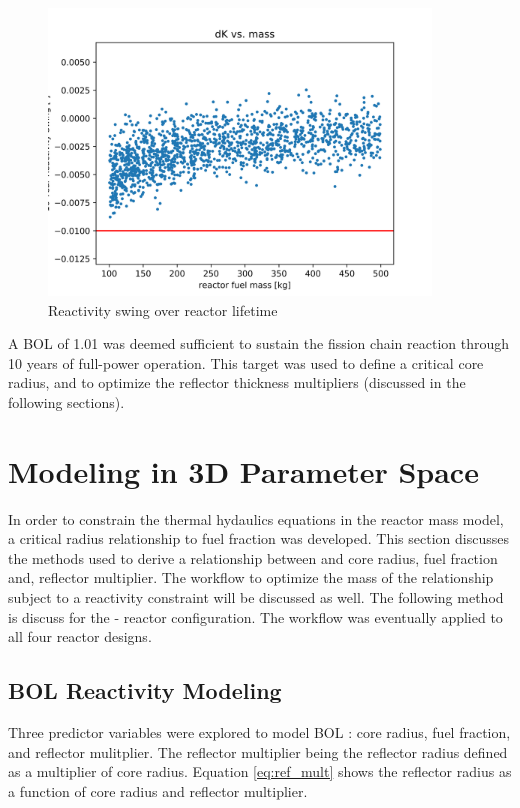 \begin{figure}[h]
    \centering
    \includegraphics[width=4in]{../images/dK_vs_mass.png}
\caption{Reactivity swing over reactor lifetime}
\label{fig:delta_k_eol}
\end{figure}

A BOL \keff of 1.01 was deemed sufficient to sustain the fission chain reaction
through 10 years of full-power operation. This \keff target was used to define a
critical core radius, and to optimize the reflector thickness multipliers
(discussed in the following sections).

\section{Modeling \keff in 3D Parameter Space}\label{sec:crit_model}
In order to constrain the thermal hydaulics equations in the 
reactor mass model, a critical radius relationship to fuel fraction was developed. 
This section discusses the methods used to derive a relationship between \keff
and core radius, fuel fraction and, reflector multiplier. The workflow to
optimize the mass of the \keff relationship subject to a reactivity constraint
will be discussed as well. The following method is discuss for the \uox-\codiox
reactor configuration. The workflow was eventually applied to all four reactor
designs.

\subsection{BOL Reactivity Modeling}
Three predictor variables were explored to model BOL \keff: core radius,
fuel fraction, and reflector mulitplier. The reflector multiplier being the
reflector radius defined as a multiplier of core radius. Equation
\ref{eq:ref_mult} shows the reflector radius as a function of core radius and
reflector multiplier.

